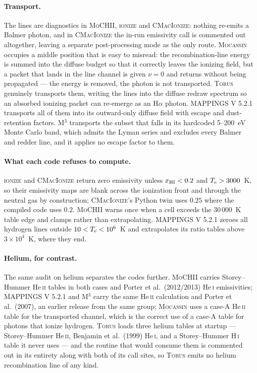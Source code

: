 \documentclass[english,a4paper]{my_memo}
\newcommand{\MoCHII}{\textsc{MoCHII}}
\newcommand{\Mthree}{M$^3$}
\newcommand{\Mappings}{MAPPINGS V 5.2.1}
\newcommand{\Wood}{\textsc{ionize}}
\newcommand{\CMI}{\textsc{CMacIonize}}
\newcommand{\Torus}{\textsc{Torus}}
\newcommand{\Mocassin}{\textsc{Mocassin}}
\newcommand{\Te}{T_{\rm e}}
\begin{document}
\paragraph{Transport.}  The lines are diagnostics in \MoCHII{}, \Wood{} and
\CMI{}: nothing re-emits a Balmer photon, and in \CMI{} the in-run
emissivity call is commented out altogether, leaving a separate
post-processing mode as the only route.  \Mocassin{} occupies a middle
position that is easy to misread: the recombination-line energy is summed
into the diffuse budget so that it correctly leaves the ionizing field, but a
packet that lands in the line channel is given $\nu = 0$ and returns without
being propagated --- the energy is removed, the photon is not transported.
\Torus{} genuinely transports them, writing the lines into the diffuse redraw
spectrum so an absorbed ionizing packet can re-emerge as an H$\alpha$ photon.
\Mappings{} transports all of them into its outward-only diffuse field with
escape and dust-retention factors.  \Mthree{} transports the subset that
falls in its hardcoded 5--200~eV Monte Carlo band, which admits the Lyman
series and excludes every Balmer and redder line, and it applies no escape
factor to them.

\paragraph{What each code refuses to compute.}  \Wood{} and \CMI{} return
zero emissivity unless $x_{\rm HI} < 0.2$ and $\Te > 3000$~K, so their
emissivity maps are blank across the ionization front and through the neutral
gas by construction; \CMI{}'s Python twin uses $0.25$ where the compiled code
uses $0.2$.  \MoCHII{} warns once when a cell exceeds the 30\,000~K table
edge and clamps rather than extrapolating.  \Mappings{} zeroes all hydrogen
lines outside $10 < \Te < 10^6$~K and extrapolates its ratio tables above
$3\times10^4$~K, where they end.

\paragraph{Helium, for contrast.}  The same audit on helium separates the
codes further.  \MoCHII{} carries Storey--Hummer He\,\textsc{ii} tables in
both cases and Porter et al.\ (2012/2013) He\,\textsc{i} emissivities;
\Mappings{} and \Mthree{} carry the same He\,\textsc{ii} calculation and
Porter et al.\ (2007), an earlier release from the same group;
\Mocassin{} uses a case-A He\,\textsc{ii} table for the transported channel,
which is the correct use of a case-A table for photons that ionize hydrogen.
\Torus{} loads three helium tables at startup --- Storey--Hummer
He\,\textsc{ii}, Benjamin et al.\ (1999) He\,\textsc{i}, and a
Storey--Hummer H\,\textsc{i} table it never uses --- and the routine that
would consume them is commented out in its entirety along with both of its
call sites, so \Torus{} emits no helium recombination line of any kind.
\end{document}
